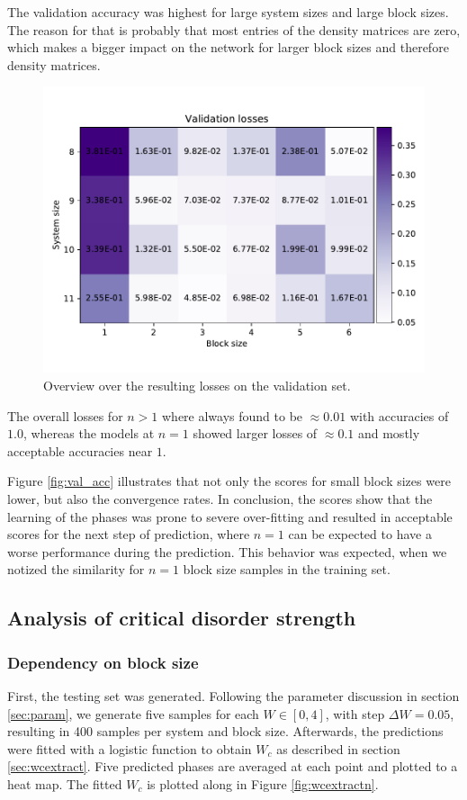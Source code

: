\documentclass[reprint,amsmath,amssymb,aps,prb]{revtex4-2}
\begin{document}
The validation accuracy was highest for large system sizes and large block sizes. The reason for that is probably that most entries of the density matrices are zero, which makes a bigger impact on the network for larger block sizes and therefore density matrices.
\begin{figure}
	\centering
	\includegraphics[width=\linewidth]{../results/accuracy_loss_epochs/all_validation_losses}
	\caption{Overview over the resulting losses on the validation set.}
	\label{fig:all_validation_accuracy}
\end{figure}

The overall losses for $n>1$ where always found to be $\approx 0.01$ with accuracies of $1.0$, whereas the models at $n=1$ showed larger losses of  $\approx 0.1$ and mostly acceptable accuracies near $1$.

Figure \ref{fig:val_acc} illustrates that not only the scores for small block sizes were lower, but also the convergence rates. In conclusion, the scores show that the learning of the phases was prone to severe over-fitting and resulted in acceptable scores for the next step of prediction, where $n=1$ can be expected to have a worse performance during the prediction. This behavior was expected, when we notized the similarity for $n=1$ block size samples in the training set.

\subsection{Analysis of critical disorder strength}
\subsubsection{Dependency on block size}
First, the testing set was generated. Following the parameter discussion in section \ref{sec:param}, we generate five samples for each $W\in\left[0,4\right]$, with step $\Delta W=0.05$, resulting in 400 samples per system and block size. Afterwards, the predictions were fitted with a logistic function to obtain $W_c$ as described in section \ref{sec:wcextract}.
Five predicted phases are averaged at each point and plotted to a heat map. The fitted $W_c$ is plotted along in Figure \ref{fig:wcextractn}.
\end{document}
